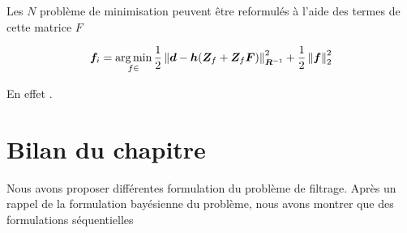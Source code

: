 Les $N$ problème de minimisation peuvent être reformulés à l'aide des termes de cette matrice $F$

\begin{equation*}
    \bm f_i = \operatorname*{arg\,min}_{f \in } \frac12 \left\lVert \bm d - \bm h(\bm{Z}_f + \bm{Z}_f \bm{F}) \right\rVert^2_{\bm R^{-1}} + \frac12 \left\lVert \bm f \right\rVert_2^2
\end{equation*}

En effet .

\section{Bilan du chapitre}


Nous avons proposer différentes formulation du problème de filtrage. Après un rappel de la formulation bayésienne du problème, nous avons montrer que des formulations séquentielles

